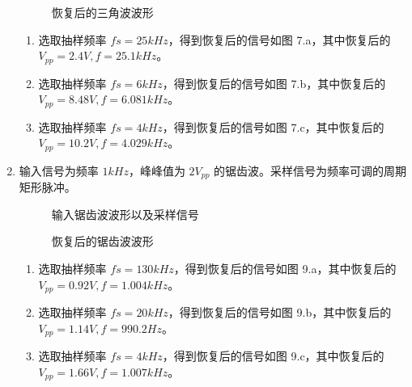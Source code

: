 \documentclass[dvipsnames, svgnames,a4paper,11pt]{article}
\begin{document}
\begin{enumerate}
\begin{figure}[htbp]
        \caption{恢复后的三角波波形}
      \end{figure}

      \begin{enumerate}
        \item 选取抽样频率 $fs = 25kHz$，得到恢复后的信号如图 7.a，其中恢复后的 $V_{pp} = 2.4V,f = 25.1kHz$。
        \item 选取抽样频率 $fs = 6kHz$，得到恢复后的信号如图 7.b，其中恢复后的 $V_{pp} = 8.48V,f = 6.081kHz$。
        \item 选取抽样频率 $fs = 4kHz$，得到恢复后的信号如图 7.c，其中恢复后的 $V_{pp} = 10.2V,f = 4.029kHz$。
      \end{enumerate}
    
    \newpage
    \item 输入信号为频率 $1kHz$，峰峰值为 $2V_{pp}$ 的锯齿波。采样信号为频率可调的周期矩形脉冲。
      \begin{figure}[htbp]
        \centering
        \caption{输入锯齿波波形以及采样信号}
      \end{figure}
      \begin{figure}[htbp]
        \centering

        \caption{恢复后的锯齿波波形}
      \end{figure}

      \begin{enumerate}
        \item 选取抽样频率 $fs = 130kHz$，得到恢复后的信号如图 9.a，其中恢复后的 $V_{pp} = 0.92V,f = 1.004kHz$。
        \item 选取抽样频率 $fs = 20kHz$，得到恢复后的信号如图 9.b，其中恢复后的 $V_{pp} = 1.14V,f = 990.2Hz$。
        \item 选取抽样频率 $fs = 4kHz$，得到恢复后的信号如图 9.c，其中恢复后的 $V_{pp} = 1.66V,f = 1.007kHz$。
      \end{enumerate}

  \end{enumerate}
\end{document}
